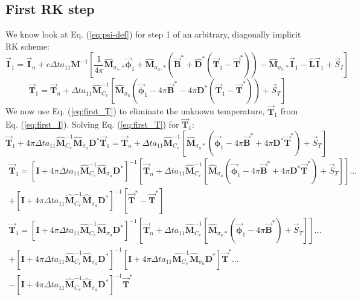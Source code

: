 \documentclass[11pt]{article}
\newcommand{\benum}{\begin{equation}}
\newcommand{\eenum}{\end{equation}}
\newcommand{\be}{\begin{equation*}}
\newcommand{\ee}{\end{equation*}}
\newcommand{\eqt}[1]{Eq. (\ref{#1})}
\newcommand{\vect}[1]{\ensuremath{ \vec{\mathbf #1}}}
\newcommand{\Mw}{\ensuremath{\widehat{\mathbf M}}}
\begin{document}
\subsection{First RK step}
We know look at \eqt{eq:psi-def} for step 1 of an arbitrary, diagonally implicit RK scheme:
\benum
\vect{I}_1 = \vect{I}_n + c\Delta t a_{11}\mathbf{M}^{-1}\left[   
\frac{1}{4\pi}\widehat{ \mathbf M}_{\sigma_s,*}\vect{\phi}_1 + \widehat{\mathbf M}_{\sigma_a,*}\left(\vect{B}^* + \widehat{\mathbf D}^*\left(\vect{T}_1 -\vect{T}^*  \right)   \right)- \widehat{\mathbf M}_{\sigma_t,*} \vect{I}_1 - \widehat{ \mathbf L}\vect{I}_1 
+ \vec{S}_I
\right]
\label{eq:first_I}
\eenum
\benum
\vect{T}_1  = \vect{T}_n + \Delta t a_{11} \Mw_{C_v}^{-1}\left[
\Mw_{\sigma_a} \left(\vect{\phi}_1 - 4\pi\vect{B}^* - 4\pi\mathbf{D}^*\left( \vect{T}_1 - \vect{T}^* \right)\right) + \vec{S}_T
\right]
\label{eq:first_T}
\eenum
We now use \eqt{eq:first_T} to eliminate the unknown temperature, $\vect{T}_1$ from \eqt{eq:first_I}. Solving \eqt{eq:first_T} for $\vect{T}_1$:
\be
\vect{T}_1 +  4\pi\Delta t a_{11} \Mw_{C_v}^{-1}\Mw_{\sigma_a}\mathbf{D}^* \vect{T}_1   = \vect{T}_n + \Delta t a_{11} \Mw_{C_v}^{-1}\left[
\Mw_{\sigma_a*} \left(\vect{\phi}_1 -  4\pi\vect{B}^*+ 4\pi\mathbf{D}^*\vect{T}^* \right) + \vec{S}_T
\right]
\ee
\begin{multline*}
\vect{T}_1 = \left[\mathbf{I} + 4\pi\Delta t a_{11}  \Mw_{C_v}^{-1}\Mw_{\sigma_a}\mathbf{D}^*   \right]^{-1}
\left[
\vect{T}_n + \Delta t a_{11}  \Mw_{C_v}^{-1}\left[ \Mw_{\sigma_a} \left(\vect{\phi}_1 -4\pi \vect{B}^*+ 4\pi\mathbf{D}^*\vect{T}^* \right) +  \vec{S}_T \right]  
\right] \dots \\ + \left[\mathbf{I} + 4\pi\Delta t a_{11}  \Mw_{C_v}^{-1}\Mw_{\sigma_a}\mathbf{D}^*   \right]^{-1}\left[\vect{T}^* - \vect{T}^*  \right]
\end{multline*}
%
%
\begin{multline*}
\vect{T}_1 = \left[\mathbf{I} + 4\pi\Delta t a_{11}  \Mw_{C_v}^{-1}\Mw_{\sigma_a}\mathbf{D}^*   \right]^{-1}
\left[
\vect{T}_n + \Delta t a_{11}  \Mw_{C_v}^{-1}\left[ \Mw_{\sigma_a*} \left(\vect{\phi}_1 - 4\pi\vect{B}^*  \right)+ \vec{S}_T \right]\right] \dots \\ 
+ 
\left[\mathbf{I} +  4\pi\Delta t a_{11}  \Mw_{C_v}^{-1}\Mw_{\sigma_a}\mathbf{D}^*  \right]^{-1}
\left[\mathbf{I} +  4\pi\Delta t a_{11}  \Mw_{C_v}^{-1}\Mw_{\sigma_a}\mathbf{D}^*   \right] \vect{T}^* \dots \\
- \left[\mathbf{I} +  4\pi\Delta t a_{11}  \Mw_{C_v}^{-1}\Mw_{\sigma_a}\mathbf{D}^*   \right]^{-1}\vect{T}^*
\end{multline*}
\end{document}
